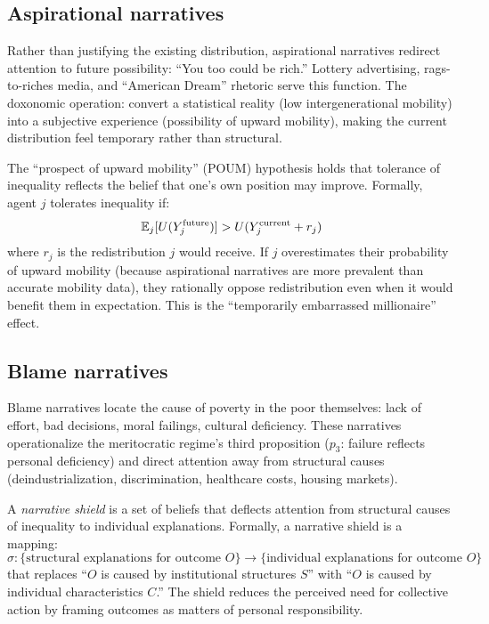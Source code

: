\subsection{Aspirational narratives}

Rather than justifying the existing distribution, aspirational narratives redirect attention to future possibility: ``You too could be rich.''
Lottery advertising, rags-to-riches media, and ``American Dream'' rhetoric serve this function.
The doxonomic operation: convert a statistical reality (low intergenerational mobility) into a subjective experience (possibility of upward mobility), making the current distribution feel temporary rather than structural.

\begin{proposition}
\label{prop:poum}
The ``prospect of upward mobility'' (POUM) hypothesis holds that tolerance of inequality reflects the belief that one's own position may improve.
Formally, agent $j$ tolerates inequality if:
\[
  \mathbb{E}_j[U(Y_j^{\text{future}})] > U(Y_j^{\text{current}} + r_j)
\]
where $r_j$ is the redistribution $j$ would receive.
If $j$ overestimates their probability of upward mobility (because aspirational narratives are more prevalent than accurate mobility data), they rationally oppose redistribution even when it would benefit them in expectation.
This is the ``temporarily embarrassed millionaire'' effect.
\end{proposition}

\subsection{Blame narratives}

Blame narratives locate the cause of poverty in the poor themselves: lack of effort, bad decisions, moral failings, cultural deficiency.
These narratives operationalize the meritocratic regime's third proposition ($p_3$: failure reflects personal deficiency) and direct attention away from structural causes (deindustrialization, discrimination, healthcare costs, housing markets).

\begin{definition}
\label{def:narrative-shield}
A \emph{narrative shield} is a set of beliefs that deflects attention from structural causes of inequality to individual explanations.
Formally, a narrative shield is a mapping:
\[
  \sigma: \{\text{structural explanations for outcome } O\} \to \{\text{individual explanations for outcome } O\}
\]
that replaces ``$O$ is caused by institutional structures $S$'' with ``$O$ is caused by individual characteristics $C$.''
The shield reduces the perceived need for collective action by framing outcomes as matters of personal responsibility.
\end{definition}

